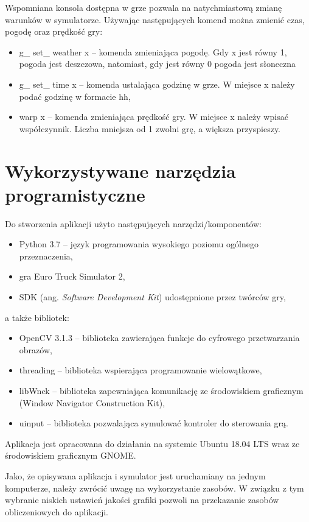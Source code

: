 Wspomniana konsola dostępna w grze pozwala na natychmiastową zmianę warunków w symulatorze. 
Używając następujących komend można zmienić czas, pogodę oraz prędkość gry:

\begin{itemize}
\item g\_ set\_ weather x -- komenda zmieniająca pogodę. Gdy x jest równy 1, pogoda jest deszczowa, natomiast, gdy jest równy 0 pogoda jest słoneczna
\item g\_ set\_ time x -- komenda ustalająca godzinę w grze. W miejsce x należy podać godzinę w formacie hh,
\item warp x -- komenda zmieniająca prędkość gry. W miejsce x należy wpisać współczynnik. Liczba mniejsza od 1 zwolni grę, a większa przyspieszy.
\end{itemize}


\section{Wykorzystywane narzędzia programistyczne}


Do stworzenia aplikacji użyto następujących narzędzi/komponentów:
\begin{itemize}
\item Python 3.7 -- język programowania wysokiego poziomu ogólnego przeznaczenia,
\item gra Euro Truck Simulator 2,
\item SDK (ang. \textit{Software Development Kit}) udostępnione przez twórców gry,
\end{itemize}
a także bibliotek: 
\begin{itemize}
\item OpenCV 3.1.3 -- biblioteka zawierająca funkcje do cyfrowego przetwarzania obrazów,
\item threading -- biblioteka wspierająca programowanie wielowątkowe,
\item libWnck -- biblioteka zapewniająca komunikację ze środowiskiem graficznym (Window Navigator Construction Kit),
\item uinput -- biblioteka pozwalająca symulować kontroler do sterowania grą.
\end{itemize}

Aplikacja jest opracowana do działania na systemie Ubuntu 18.04 LTS wraz ze środowiskiem graficznym GNOME.

Jako, że opisywana aplikacja i symulator jest uruchamiany na jednym komputerze, należy zwrócić uwagę na wykorzystanie zasobów. 
W związku z tym wybranie niskich ustawień jakości grafiki pozwoli na przekazanie zasobów obliczeniowych do aplikacji.


